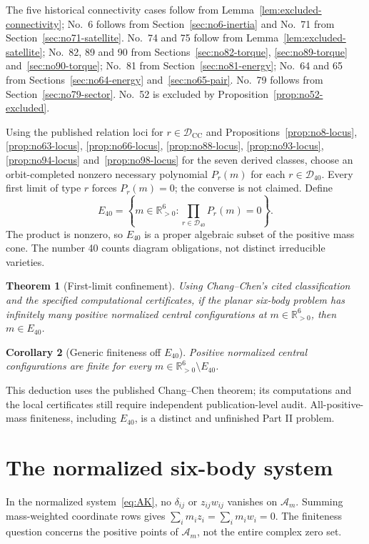 \documentclass[11pt]{amsart}
\newtheorem{theorem}{Theorem}[section]
\newtheorem{corollary}[theorem]{Corollary}
\theoremstyle{remark}
\newcommand{\A}{\mathcal A}
\newcommand{\D}{\mathcal D}
\begin{document}
The five historical connectivity cases follow from Lemma~\ref{lem:excluded-connectivity}; No.~6 follows from Section~\ref{sec:no6-inertia} and No.~71 from Section~\ref{sec:no71-satellite}. No.~74 and 75 follow from Lemma~\ref{lem:excluded-satellite}; No.~82, 89 and 90 from Sections~\ref{sec:no82-torque}, \ref{sec:no89-torque} and~\ref{sec:no90-torque}; No.~81 from Section~\ref{sec:no81-energy}; No.~64 and 65 from Sections~\ref{sec:no64-energy} and~\ref{sec:no65-pair}. No.~79 follows from Section~\ref{sec:no79-sector}. No.~52 is excluded by Proposition~\ref{prop:no52-excluded}.

Using the published relation loci for $r\in\D_{\mathrm{CC}}$ and Propositions~\ref{prop:no8-locus}, \ref{prop:no63-locus}, \ref{prop:no66-locus}, \ref{prop:no88-locus}, \ref{prop:no93-locus}, \ref{prop:no94-locus} and~\ref{prop:no98-locus} for the seven derived classes, choose an orbit-completed nonzero necessary polynomial $P_r(m)$ for each $r\in\D_{40}$. Every first limit of type $r$ forces $P_r(m)=0$; the converse is not claimed. Define
\begin{equation}\label{eq:E40}
E_{40}=\left\{m\in\mathbb R_{>0}^6:\prod_{r\in\D_{40}}P_r(m)=0\right\}.
\end{equation}
The product is nonzero, so $E_{40}$ is a proper algebraic subset of the positive mass cone. The number 40 counts diagram obligations, not distinct irreducible varieties.

\begin{theorem}[First-limit confinement]\label{thm:obstruction}
Using Chang--Chen's cited classification and the specified computational certificates, if the planar six-body problem has infinitely many positive normalized central configurations at $m\in\mathbb R_{>0}^6$, then $m\in E_{40}$.
\end{theorem}
\begin{corollary}[Generic finiteness off $E_{40}$]\label{cor:generic}
Positive normalized central configurations are finite for every $m\in\mathbb R_{>0}^6\setminus E_{40}$.
\end{corollary}
This deduction uses the published Chang--Chen theorem; its computations and the local certificates still require independent publication-level audit. All-positive-mass finiteness, including $E_{40}$, is a distinct and unfinished Part II problem.

\section{The normalized six-body system}\label{sec:system}
In the normalized system~\eqref{eq:AK}, no $\delta_{ij}$ or $z_{ij}w_{ij}$ vanishes on $\A_m$. Summing mass-weighted coordinate rows gives $\sum_i m_iz_i=\sum_i m_iw_i=0$. The finiteness question concerns the positive points of $\A_m$, not the entire complex zero set.
\end{document}
